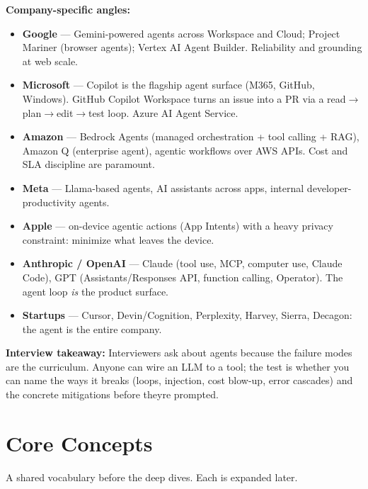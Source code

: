 \documentclass[11pt]{article}
\providecommand{\tightlist}{\setlength{\itemsep}{1pt}\setlength{\parskip}{0pt}}
\begin{document}
\textbf{Company-specific angles:}

\begin{itemize}
\tightlist
\item
  \textbf{Google} --- Gemini-powered agents across Workspace and Cloud; Project Mariner (browser agents); Vertex AI Agent Builder. Reliability and grounding at web scale.
\item
  \textbf{Microsoft} --- Copilot is the flagship agent surface (M365, GitHub, Windows). GitHub Copilot Workspace turns an issue into a PR via a read\(\rightarrow\)plan\(\rightarrow\)edit\(\rightarrow\)test loop. Azure AI Agent Service.
\item
  \textbf{Amazon} --- Bedrock Agents (managed orchestration + tool calling + RAG), Amazon Q (enterprise agent), agentic workflows over AWS APIs. Cost and SLA discipline are paramount.
\item
  \textbf{Meta} --- Llama-based agents, AI assistants across apps, internal developer-productivity agents.
\item
  \textbf{Apple} --- on-device agentic actions (App Intents) with a heavy privacy constraint: minimize what leaves the device.
\item
  \textbf{Anthropic / OpenAI} --- Claude (tool use, MCP, computer use, Claude Code), GPT (Assistants/Responses API, function calling, Operator). The agent loop \emph{is} the product surface.
\item
  \textbf{Startups} --- Cursor, Devin/Cognition, Perplexity, Harvey, Sierra, Decagon: the agent is the entire company.
\end{itemize}

\textbf{Interview takeaway:} Interviewers ask about agents because the failure modes are the curriculum. Anyone can wire an LLM to a tool; the test is whether you can name the ways it breaks (loops, injection, cost blow-up, error cascades) and the concrete mitigations before they\textquotesingle re prompted.

\section{Core Concepts}\label{core-concepts}

A shared vocabulary before the deep dives. Each is expanded later.
\end{document}
